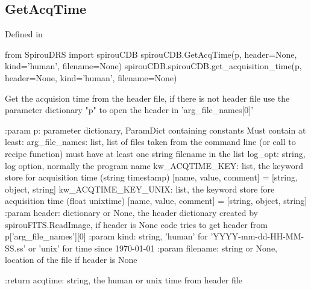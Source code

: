 \begin{minipage}{\textwidth}
\subsection{GetAcqTime}

Defined in \spirouCDB{}

\begin{pythonbox}
from SpirouDRS import spirouCDB
spirouCDB.GetAcqTime(p, header=None, kind='human', filename=None)
spirouCDB.spirouCDB.get_acquisition_time(p, header=None, kind='human', filename=None)
\end{pythonbox}

\begin{pythondocstring}
Get the acquision time from the header file, if there is not header file
use the parameter dictionary "p" to open the header in 'arg_file_names[0]'

:param p: parameter dictionary, ParamDict containing constants
    Must contain at least:
            arg_file_names: list, list of files taken from the command line
                            (or call to recipe function) must have at least
                            one string filename in the list
            log_opt: string, log option, normally the program name
            kw_ACQTIME_KEY: list, the keyword store for acquisition time
                            (string timestamp)
                        [name, value, comment] = [string, object, string]
            kw_ACQTIME_KEY_UNIX: list, the keyword store fore acquisition
                                 time (float unixtime)
                        [name, value, comment] = [string, object, string]
:param header: dictionary or None, the header dictionary created by
               spirouFITS.ReadImage, if header is None code tries to get
               header from p['arg_file_names'][0]
:param kind: string, 'human' for 'YYYY-mm-dd-HH-MM-SS.ss' or 'unix'
             for time since 1970-01-01
:param filename: string or None, location of the file if header is None

:return acqtime: string, the human or unix time from header file
\end{pythondocstring}
\end{minipage}

